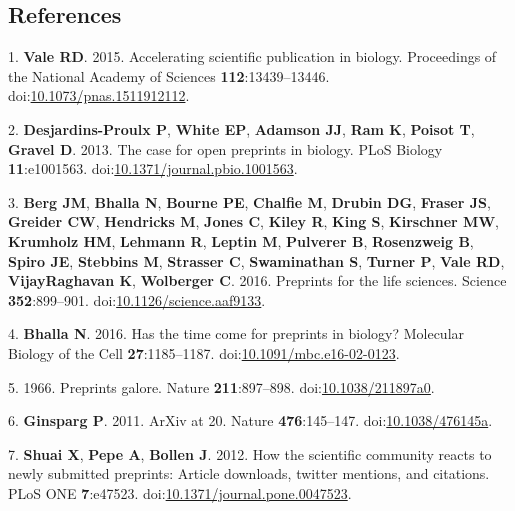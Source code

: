 \documentclass[11pt,]{article}
\begin{document}
\newpage

\subsection*{References}\label{references}

\hypertarget{refs}{}
\hypertarget{ref-Vale2015}{}
1. \textbf{Vale RD}. 2015. Accelerating scientific publication in
biology. Proceedings of the National Academy of Sciences
\textbf{112}:13439--13446.
doi:\href{https://doi.org/10.1073/pnas.1511912112}{10.1073/pnas.1511912112}.

\hypertarget{ref-DesjardinsProulx2013}{}
2. \textbf{Desjardins-Proulx P}, \textbf{White EP}, \textbf{Adamson JJ},
\textbf{Ram K}, \textbf{Poisot T}, \textbf{Gravel D}. 2013. The case for
open preprints in biology. PLoS Biology \textbf{11}:e1001563.
doi:\href{https://doi.org/10.1371/journal.pbio.1001563}{10.1371/journal.pbio.1001563}.

\hypertarget{ref-Berg2016}{}
3. \textbf{Berg JM}, \textbf{Bhalla N}, \textbf{Bourne PE},
\textbf{Chalfie M}, \textbf{Drubin DG}, \textbf{Fraser JS},
\textbf{Greider CW}, \textbf{Hendricks M}, \textbf{Jones C},
\textbf{Kiley R}, \textbf{King S}, \textbf{Kirschner MW},
\textbf{Krumholz HM}, \textbf{Lehmann R}, \textbf{Leptin M},
\textbf{Pulverer B}, \textbf{Rosenzweig B}, \textbf{Spiro JE},
\textbf{Stebbins M}, \textbf{Strasser C}, \textbf{Swaminathan S},
\textbf{Turner P}, \textbf{Vale RD}, \textbf{VijayRaghavan K},
\textbf{Wolberger C}. 2016. Preprints for the life sciences. Science
\textbf{352}:899--901.
doi:\href{https://doi.org/10.1126/science.aaf9133}{10.1126/science.aaf9133}.

\hypertarget{ref-Bhalla2016}{}
4. \textbf{Bhalla N}. 2016. Has the time come for preprints in biology?
Molecular Biology of the Cell \textbf{27}:1185--1187.
doi:\href{https://doi.org/10.1091/mbc.e16-02-0123}{10.1091/mbc.e16-02-0123}.

\hypertarget{ref-Nature1966}{}
5. 1966. Preprints galore. Nature \textbf{211}:897--898.
doi:\href{https://doi.org/10.1038/211897a0}{10.1038/211897a0}.

\hypertarget{ref-Ginsparg2011}{}
6. \textbf{Ginsparg P}. 2011. ArXiv at 20. Nature \textbf{476}:145--147.
doi:\href{https://doi.org/10.1038/476145a}{10.1038/476145a}.

\hypertarget{ref-Shuai2012}{}
7. \textbf{Shuai X}, \textbf{Pepe A}, \textbf{Bollen J}. 2012. How the
scientific community reacts to newly submitted preprints: Article
downloads, twitter mentions, and citations. PLoS ONE \textbf{7}:e47523.
doi:\href{https://doi.org/10.1371/journal.pone.0047523}{10.1371/journal.pone.0047523}.
\end{document}
